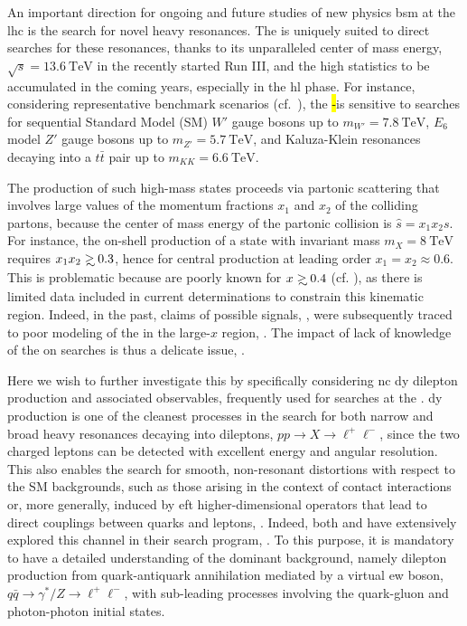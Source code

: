 
An important direction for ongoing and future studies of  new physics
\acrfull{bsm} at the \acrfull{lhc} is the search for novel heavy resonances.
%
The \lhc is uniquely suited to direct searches for these resonances, thanks to
its unparalleled center of mass energy,
$\sqrt{s}=\SI{13.6}{\tera\electronvolt}$ in the recently started  Run III, and
the high statistics to be accumulated in the coming years, especially in the
\acrfull{hl} phase.
%
For instance, considering representative benchmark \bsm scenarios (cf.\
\cite{CidVidal:2018eel}), the \hl-\lhc is sensitive to  searches for sequential
Standard Model (SM)  $W'$ gauge bosons  up to
$m_{W'}=\SI{7.8}{\tera\electronvolt}$, $E_6$ model $Z'$ gauge bosons up to
$m_{Z'}=\SI{5.7}{\tera\electronvolt}$, and Kaluza-Klein resonances decaying
into a $t\bar{t}$ pair up to $m_{KK}=\SI{6.6}{\tera\electronvolt}$.

The production of such high-mass states proceeds via partonic scattering that
involves large  values of the momentum fractions $x_1$ and $x_2$ of the
colliding partons, because the center of mass energy of the partonic collision
is $\hat s= x_1 x_2 s$.
%
For instance, the on-shell production of a state with invariant mass
$m_{X}=\SI{8}{\tera\electronvolt}$ requires $x_1x_2 \gsim 0.3$, hence for
central production at leading order $x_1=x_2\approx 0.6$. 
This is problematic because \pdfs are poorly known for $x\gsim 0.4$ (cf.
\cite{Gao:2017yyd,Kovarik:2019xvh}), as there is limited data included in
current \pdf determinations to constrain this kinematic region.
%
Indeed, in the past, claims of possible \bsm signals, \cite{CDF:1996yow}, were
subsequently traced to poor modeling of the \pdfs in the large-$x$ region,
\cite{Lai:1996mg}.
%
The impact of lack of knowledge of the \pdfs on \bsm searches is thus a
delicate issue, \cite{Beenakker:2015rna}.

Here we wish to further investigate this by specifically considering
\acrfull{nc} \acrfull{dy} dilepton production and associated observables,
frequently  used for \bsm searches at the \lhc.
%
\nc \acrlong{dy} production is one of the cleanest processes in the search for 
both narrow and broad heavy resonances decaying into dileptons, $pp \to X \to
\ell^+\ell^-$, since  the two charged leptons can be detected with excellent
energy and angular resolution.
%
This also enables the search for smooth, non-resonant distortions with respect
to the SM backgrounds, such as those arising in the context of contact
interactions  or, more generally, induced by \acrfull{eft} higher-dimensional
operators that lead to  direct couplings between quarks and
leptons, \cite{Ethier:2021bye,Dawson:2018dxp,Ellis:2020unq,Greljo:2021kvv}.
Indeed, both \atlas and \cms have extensively explored this channel in their
\bsm search program,
\cite{ATLAS:2014gys,ATLAS:2020yat,ATLAS:2019erb,CMS:2021ctt,ATLAS:2021mla,CMS:2018nlk}.
To this purpose, it is mandatory to have a detailed understanding of the
dominant \sm background, namely dilepton production from quark-antiquark
annihilation mediated by a virtual \acrfull{ew} boson, $q\bar{q} \to 
\gamma^*/Z \to \ell^+\ell^-$, with sub-leading processes involving the
quark-gluon and photon-photon initial states.

